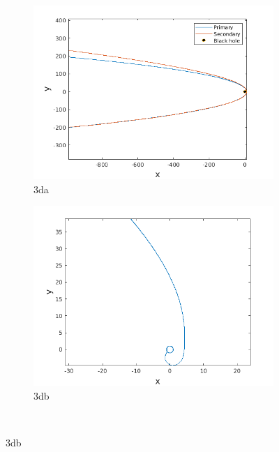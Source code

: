 \documentclass[a4paper]{article}
\begin{document}
		\begin{figure}
			\begin{subfigure} {.5\columnwidth}
				\includegraphics[width=\columnwidth]{../plots/3d_orbitsdisruption_equalaxes.png}
				\caption{3da}
				\label{fig:3da}
			\end{subfigure}
			\hfill
			\begin{subfigure} {.5\columnwidth}
				\includegraphics[width=\columnwidth]{../plots/3d_secondaryorbitdisruption_equalaxes.png}
				\caption{3db}
				\label{fig:3db}
			\end{subfigure}\\
			

\end{figure}
\end{document}

